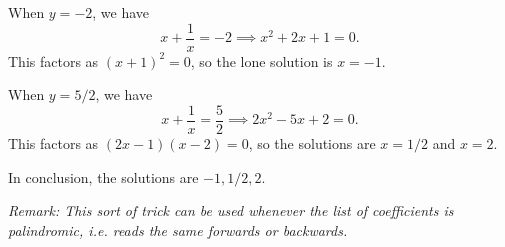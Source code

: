 \begin{enumerate}
When $y = -2$, we have
\begin{equation*}
x + \frac{1}{x} = -2\implies x^2 + 2x + 1 = 0.
\end{equation*}
This factors as $(x + 1)^2 = 0$, so the lone solution is $x = -1$.\par 
When $y = 5/2$, we have 
\begin{equation*}
x + \frac{1}{x} = \frac{5}{2}\implies 2x^2 - 5x + 2 = 0.
\end{equation*}
This factors as $(2x - 1)(x - 2) = 0$, so the solutions are $x = 1/2$ and $x = 2$.\par
In conclusion, the solutions are $\boxed{-1, 1/2, 2}$.\par 
\emph{Remark: This sort of trick can be used whenever the list of coefficients is palindromic, i.e. reads the same forwards or backwards.}
\end{enumerate}